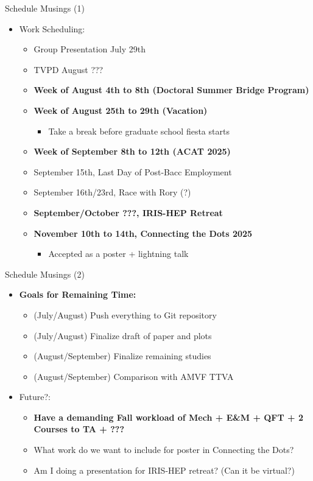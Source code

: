 \documentclass[xcolor=table,aspectratio=169]{beamer}
\begin{document}
\begin{frame}{Schedule Musings (1)}
    \begin{itemize}
        \item Work Scheduling:
        \begin{itemize}
            \item Group Presentation July 29th
            \item TVPD August ???
            \item \textbf{Week of August 4th to 8th (Doctoral Summer Bridge Program)}
            \item \textbf{Week of August 25th to 29th (Vacation)}
            \begin{itemize}
                \item Take a break before graduate school fiesta starts
            \end{itemize}
            \item \textbf{Week of September 8th to 12th (ACAT 2025)}
            \item September 15th, Last Day of Post-Bacc Employment
            \item September 16th/23rd, Race with Rory (?)
            \item \textbf{September/October ???, IRIS-HEP Retreat}
            \item \textbf{November 10th to 14th, Connecting the Dots 2025}
            \begin{itemize}
                \item Accepted as a poster + lightning talk
            \end{itemize}
        \end{itemize}
    \end{itemize}
\end{frame}

\begin{frame}{Schedule Musings (2)}
    \begin{itemize}
        \item \textbf{Goals for Remaining Time:}
        \begin{itemize}
            \item (July/August) Push everything to Git repository
            \item (July/August) Finalize draft of paper and plots
            \item (August/September) Finalize remaining studies
            \item (August/September) Comparison with AMVF TTVA
        \end{itemize}
        \item Future?:
        \begin{itemize}
            \item \textbf{Have a demanding Fall workload of Mech + E\&M + QFT + 2 Courses to TA + ???}
            \item What work do we want to include for poster in Connecting the Dots?
            \item Am I doing a presentation for IRIS-HEP retreat? (Can it be virtual?)
        \end{itemize}
    \end{itemize}
\end{frame}
\end{document}
